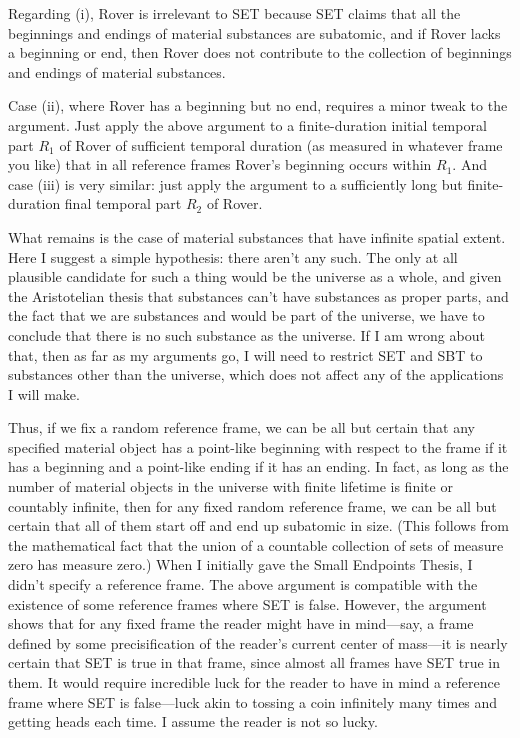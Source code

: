 Regarding (i), Rover is irrelevant to SET because SET claims that all the beginnings and endings of 
material substances are subatomic, and if Rover lacks a beginning or end, then Rover does not contribute to the collection of 
beginnings and endings of material substances. 

Case (ii), where Rover has a beginning but no end, requires a minor tweak to the argument. Just apply the above argument to 
a finite-duration initial temporal part $R_1$ of Rover of sufficient temporal duration (as measured in whatever frame you like)
that in all reference frames Rover's beginning occurs within $R_1$. And case (iii) is very similar: just apply the argument to 
a sufficiently long but finite-duration final temporal part $R_2$ of Rover.

What remains is the case of material substances that have infinite spatial extent. Here I suggest a simple hypothesis: there aren't
any such. The only at all plausible candidate for such a thing would be the universe as a whole, and given the Aristotelian 
thesis that substances can't have substances as proper parts, and the fact that we are substances and would be part of the universe,
we have to conclude that there is no such substance as the universe. If I am wrong about that, then as far as my arguments go,
I will need to restrict SET and SBT to substances other than the universe, which does not affect any of the applications I will
make.

Thus, if we fix a random reference frame, we can be all but certain that any specified material object has a point-like 
beginning with respect to the frame if it has a beginning and a point-like ending if it has an ending. In fact, 
as long as the number of material objects in 
the universe with finite lifetime is finite or countably infinite, then for any fixed random reference frame, we can be all 
but certain that all of them start off and end up subatomic in size. (This follows from the mathematical fact that the 
union of a countable collection of sets of measure zero has measure zero.) When I initially gave the Small Endpoints Thesis, 
I didn't specify a reference frame. The above argument is compatible with the existence of some reference frames where SET is 
false. However, the argument shows that for any fixed frame the reader might have in mind---say, a frame defined by some 
precisification of the reader's current center of mass---it is nearly certain that SET is true in that frame, since 
almost all frames have SET true in them. It would require incredible luck for the reader to have in mind a reference 
frame where SET is false—luck akin to tossing a coin infinitely many times and getting heads each time. I assume the reader is not so lucky.

